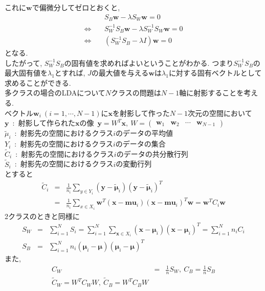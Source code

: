 これに$\bm{w}$で偏微分してゼロとおくと,
\begin{eqnarray*}
    &&S_{B}\bm{w}-\lambda S_{W}\bm{w}=0\\
    \Longleftrightarrow\ && S_{W}^{-1}S_{B}\bm{w}-\lambda S_{W}^{-1}S_{W}\bm{w}=0\\
    \Longleftrightarrow\ && (S_{W}^{-1}S_{B}-\lambda I)\bm{w}=0
\end{eqnarray*}
となる.\\
したがって, $S_{W}^{-1}S_{B}$の固有値を求めればよいということがわかる. つまり$S_{W}^{-1}S_{B}$の最大固有値を$\lambda_{1}$とすれば, $J$の最大値を与える$\bm{w}$は$\lambda_{1}$に対する固有ベクトルとして求めることができる.\\[1cm]
多クラスの場合のLDAについて$N$クラスの問題は$N-1$軸に射影することを考える.\\
ベクトル$\bm{w}_{i}\ (i=1,\cdots,N-1)$に$\bm{x}$を射影して作った$N-1$次元の空間において\\
$\bm{y}$\ :\ 射影して作られた$\bm{x}$の像\ $\bm{y}=W^{T}\bm{x},\ W=\begin{pmatrix}\bm{w}_{1}&\bm{w}_{2}&\cdots&\bm{w}_{N-1}\end{pmatrix}$\\
$\tilde{\mu}_{i}$\ :\ 射影先の空間におけるクラス$i$のデータの平均値\\
$Y_{i}$\ :\ 射影先の空間におけるクラス$i$のデータの集合\\
$\tilde{C}_{i}$\ :\ 射影先の空間におけるクラス$i$のデータの共分散行列\\
$\tilde{S}_{i}$\ :\ 射影先の空間におけるクラス$i$の変動行列\\
とすると
\begin{eqnarray*}
    \tilde{C}_{i}&=&\frac{1}{n_{i}}\sum_{y\in Y_{i}}(\bm{y}-\tilde{\bm{\mu}}_{i})(\bm{y}-\tilde{\bm{\mu}}_{i})^{T}\\
                 &=&\frac{1}{n_{i}}\sum_{x\in X_{i}}\bm{w}^{T}(\bm{x}-\bm{mu}_{i})(\bm{x}-\bm{mu}_{i})^{T}\bm{w}=\bm{w}^{T}C_{i}\bm{w}
\end{eqnarray*}
2クラスのときと同様に
\begin{eqnarray*}
    S_{W}&=&\sum_{i=1}^{N}S_{i}=\sum_{i=1}^{N}\sum_{\bm{x}\in X_{i}}(\bm{x}-\bm{\mu}_{i})(\bm{x}-\bm{\mu}_{i})^{T}=\sum_{i=1}^{N}n_{i}C_{i}\\
    S_{B}&=&\sum_{i=1}^{N}n_{i}(\bm{\mu}_{i}-\bm{\mu})(\bm{\mu}_{i}-\bm{\mu})^{T}
\end{eqnarray*}
また,
\begin{eqnarray*}
    C_{W}&=&\frac{1}{n}S_{W},\ C_{B}=\frac{1}{n}S_{B}\\
    \tilde{C}_{W}=W^{T}C_{W}W,\ \tilde{C}_{B}=W^{T}C_{B}W
\end{eqnarray*}
